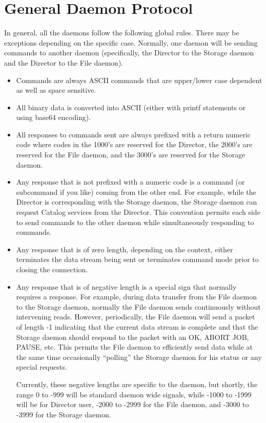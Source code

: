 \section{General Daemon Protocol}

In general, all the daemons follow the following global rules. There may be
exceptions depending on the specific case. Normally, one daemon will be
sending commands to another daemon (specifically, the Director to the Storage
daemon and the Director to the File daemon). 

\begin{itemize}
\item Commands are always ASCII commands that are  upper/lower case dependent
   as well as space sensitive.  
\item All binary data is converted into ASCII (either with printf statements
   or  using base64 encoding).  
\item All responses to commands sent are always  prefixed with a return
   numeric code where codes in the 1000's are  reserved for the Director, the
   2000's are reserved for the  File daemon, and the 3000's are reserved for the
Storage daemon.  
\item Any response that is not prefixed with a numeric  code is a command (or
   subcommand if you like) coming  from the other end. For example, while the
   Director is  corresponding with the Storage daemon, the Storage daemon  can
request Catalog services from the Director. This  convention permits each side
to send commands to the  other daemon while simultaneously responding to
commands.  
\item Any response that is of zero length, depending on the context,  either
   terminates the data stream being sent or terminates command mode  prior to
   closing the connection. 
\item Any response that is of negative length is a special sign that  normally
   requires a response. For example, during data transfer from the  File daemon
   to the Storage daemon, normally the File daemon  sends continuously without
intervening reads. However, periodically,  the File daemon will send a packet
of length -1 indicating that  the current data stream is complete and that the
Storage  daemon should respond to the packet with an OK, ABORT JOB,  PAUSE,
etc. This permits the File daemon to efficiently send  data while at the same
time occasionally ``polling''  the Storage daemon for his status or any
special requests.  

Currently, these negative lengths are specific to the daemon, but  shortly,
the range 0 to -999 will be standard daemon wide signals,  while -1000 to
-1999 will be for Director user, -2000 to -2999  for the File daemon, and
-3000 to -3999 for the Storage  daemon. 
\end{itemize}

